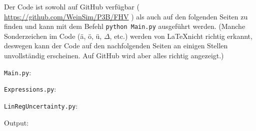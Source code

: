 \documentclass{article}
\newcommand{\githuburl}{
    \url{https://github.com/WeinSim/P3B/FHV}
}
\begin{document}
Der Code ist sowohl auf GitHub verfügbar (\githuburl) als auch auf den folgenden
Seiten zu finden und kann mit dem Befehl \texttt{python Main.py} ausgeführt werden.
(Manche Sonderzeichen im Code (ä, ö, ü, $\Delta$, etc.) werden von \LaTeX nicht
richtig erkannt, deswegen kann der Code auf den nachfolgenden Seiten an einigen
Stellen unvollständig erscheinen. Auf GitHub wird aber alles richtig angezeigt.)

\newpage


\verb|Main.py|:

\newpage

\verb|Expressions.py|:

\newpage

\verb|LinRegUncertainty.py|:

\newpage

Output:

\end{document}
